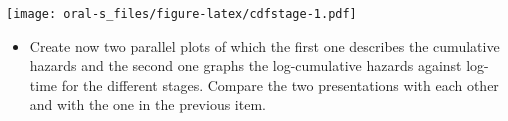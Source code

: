 \documentclass[
]{book}
\newenvironment{Shaded}{\begin{snugshade}}{\end{snugshade}}
\newcommand{\AttributeTok}[1]{\textcolor[rgb]{0.13,0.29,0.53}{#1}}
\newcommand{\ConstantTok}[1]{\textcolor[rgb]{0.56,0.35,0.01}{#1}}
\newcommand{\DecValTok}[1]{\textcolor[rgb]{0.00,0.00,0.81}{#1}}
\newcommand{\FloatTok}[1]{\textcolor[rgb]{0.00,0.00,0.81}{#1}}
\newcommand{\FunctionTok}[1]{\textcolor[rgb]{0.13,0.29,0.53}{\textbf{#1}}}
\newcommand{\NormalTok}[1]{#1}
\newcommand{\OtherTok}[1]{\textcolor[rgb]{0.56,0.35,0.01}{#1}}
\newcommand{\SpecialCharTok}[1]{\textcolor[rgb]{0.81,0.36,0.00}{\textbf{#1}}}
\newcommand{\StringTok}[1]{\textcolor[rgb]{0.31,0.60,0.02}{#1}}
\providecommand{\tightlist}{%
  \setlength{\itemsep}{0pt}\setlength{\parskip}{0pt}}
\begin{document}
\begin{Shaded}
\end{Shaded}

\texttt{[image: oral-s\_files/figure-latex/cdfstage-1.pdf]}

\begin{itemize}
\tightlist
\item
  Create now two parallel plots of which the first one describes the
  cumulative hazards
  and the second one graphs the log-cumulative hazards against log-time
  for the different stages. Compare the two presentations
  with each other and with the one in the previous item.
\end{itemize}
\end{document}
